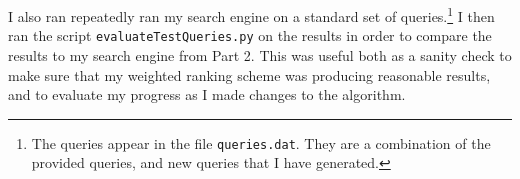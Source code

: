 \documentclass[11pt]{article}
\begin{document}
I also ran repeatedly ran my search engine on a standard set of queries.\footnote{The queries appear in
the file \texttt{queries.dat}. They are a combination of the provided queries, and new
queries that I have generated.} I then ran the script \texttt{evaluateTestQueries.py} on the results in order
to compare the results to my search engine from Part 2. This was useful both as a sanity check to
make sure that my weighted ranking scheme was producing reasonable results, and to evaluate my progress as
I made changes to the algorithm.

%
%
%
%
\end{document}
